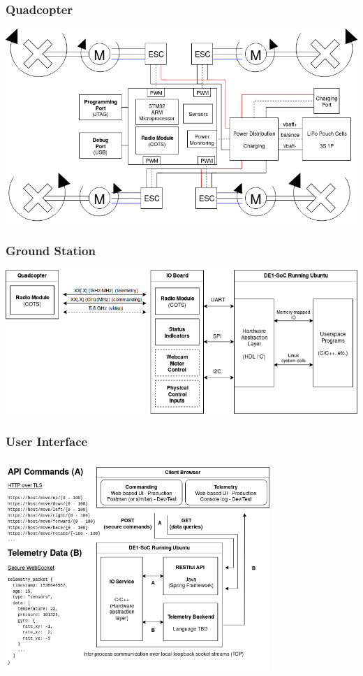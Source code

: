 \documentclass{beamer}
\begin{document}
\begin{frame}
\frametitle{Quadcopter}
\begin{center}
\includegraphics[width=\linewidth]{../src/im/quadcopter}
\end{center}
\end{frame}

\begin{frame}
\frametitle{Ground Station}
\begin{center}
\includegraphics[width=\linewidth]{../src/im/ground_station}
\end{center}
\end{frame}

\begin{frame}
\frametitle{User Interface}
\begin{center}
\includegraphics[height=225pt,width=\linewidth,keepaspectratio]{../src/im/display_controller}
\end{center}
\end{frame}
\end{document}
